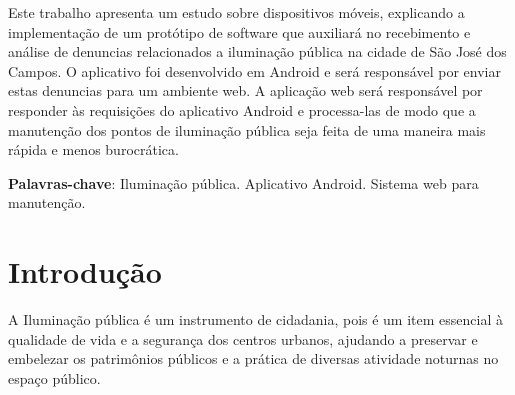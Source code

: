 \documentclass[
	article,			%
	11pt,				%
	oneside,			%
	a4paper,			%
	english,			%
	brazil,				%
	sumario=tradicional
	]{abntex2}
\begin{document}

\frenchspacing


%
%
\maketitle

\begin{resumoumacoluna}
    Este trabalho apresenta um estudo sobre dispositivos móveis, explicando a implementação de um protótipo de software que auxiliará no recebimento e análise de denuncias relacionados a iluminação pública na cidade de São José dos Campos.
    O aplicativo foi desenvolvido em Android e será responsável por enviar estas denuncias para um ambiente web.
    A aplicação web será responsável por responder às requisições do aplicativo Android e processa-las de modo que a manutenção dos pontos de iluminação pública seja feita de uma maneira mais rápida e menos burocrática.
 \vspace{\onelineskip}

 \noindent
 \textbf{Palavras-chave}: Iluminação pública. Aplicativo Android. Sistema web para manutenção.
\end{resumoumacoluna}


\textual

\section*{Introdução}

A Iluminação pública é um instrumento de cidadania, pois é um item essencial à qualidade de vida e a segurança dos centros urbanos, ajudando a preservar e embelezar os patrimônios públicos e a prática de diversas atividade noturnas
no espaço público.
\end{document}
